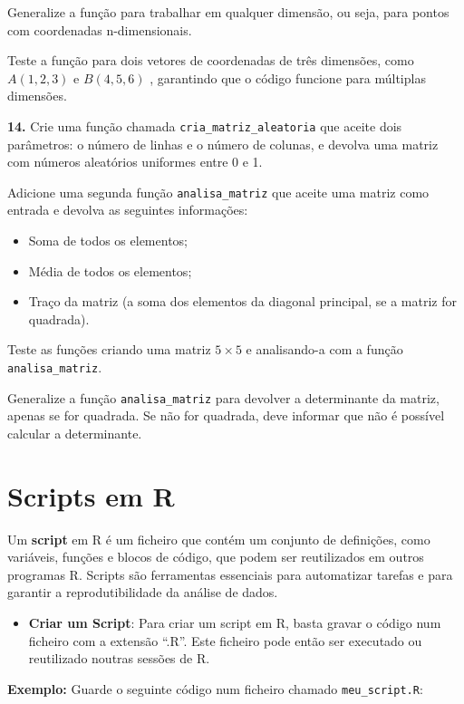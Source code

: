 \documentclass[
]{book}
\providecommand{\tightlist}{%
  \setlength{\itemsep}{0pt}\setlength{\parskip}{0pt}}
\begin{document}
Generalize a função para trabalhar em qualquer dimensão, ou seja, para pontos com coordenadas n-dimensionais.

Teste a função para dois vetores de coordenadas de três dimensões, como \(A(1, 2, 3)\) e \(B(4, 5, 6)\) , garantindo que o código funcione para múltiplas dimensões.

\textbf{14.} Crie uma função chamada \texttt{cria\_matriz\_aleatoria} que aceite dois parâmetros: o número de linhas e o número de colunas, e devolva uma matriz com números aleatórios uniformes entre 0 e 1.

Adicione uma segunda função \texttt{analisa\_matriz} que aceite uma matriz como entrada e devolva as seguintes informações:

\begin{itemize}
\tightlist
\item
  Soma de todos os elementos;
\item
  Média de todos os elementos;
\item
  Traço da matriz (a soma dos elementos da diagonal principal, se a matriz for quadrada).
\end{itemize}

Teste as funções criando uma matriz \(5 \times 5\) e analisando-a com a função \texttt{analisa\_matriz}.

Generalize a função \texttt{analisa\_matriz} para devolver a determinante da matriz, apenas se for quadrada. Se não for quadrada, deve informar que não é possível calcular a determinante.

\chapter{Scripts em R}\label{scripts-em-r}

Um \textbf{script} em R é um ficheiro que contém um conjunto de definições,
como variáveis, funções e blocos de código, que podem ser reutilizados
em outros programas R. Scripts são ferramentas essenciais para
automatizar tarefas e para garantir a reprodutibilidade da análise de
dados.

\begin{itemize}
\tightlist
\item
  \textbf{Criar um Script}: Para criar um script em R, basta gravar o
  código num ficheiro com a extensão ``.R''. Este ficheiro pode então
  ser executado ou reutilizado noutras sessões de R.
\end{itemize}

\textbf{Exemplo:} Guarde o seguinte código num ficheiro chamado
\texttt{meu\_script.R}:
\end{document}
